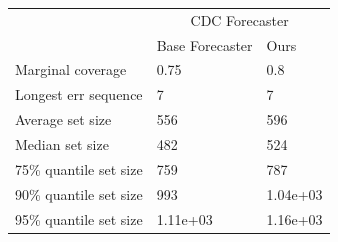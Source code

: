 \begin{tabular}{lll}
\toprule
& \multicolumn{2}{c}{CDC Forecaster} \\
& Base Forecaster & Ours \\
\midrule
Marginal coverage & 0.75 & 0.8 \\
Longest err sequence & 7 & 7 \\
Average set size & 556 & 596 \\
Median set size & 482 & 524 \\
75\% quantile set size & 759 & 787 \\
90\% quantile set size & 993 & 1.04e+03 \\
95\% quantile set size & 1.11e+03 & 1.16e+03 \\
\bottomrule
\end{tabular}
